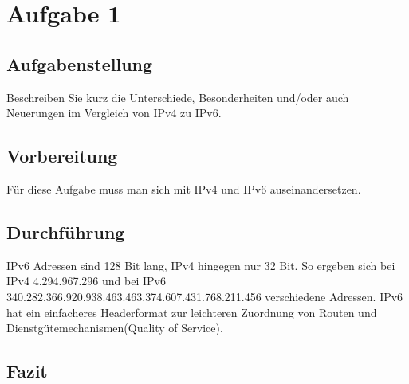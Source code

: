 \newpage

\section{Aufgabe 1}

\subsection{Aufgabenstellung}
Beschreiben Sie kurz die Unterschiede, Besonderheiten und/oder auch Neuerungen im Vergleich von IPv4 zu IPv6.

\subsection{Vorbereitung}
Für diese Aufgabe muss man sich mit IPv4 und IPv6 auseinandersetzen.

\subsection{Durchführung}
IPv6 Adressen sind 128 Bit lang, IPv4 hingegen nur 32 Bit. So ergeben sich bei IPv4 4.294.967.296 und bei IPv6 340.282.366.920.938.463.463.374.607.431.768.211.456 verschiedene Adressen. IPv6 hat ein einfacheres Headerformat zur leichteren Zuordnung von Routen und Dienstgütemechanismen(Quality of Service).

\subsection{Fazit}
